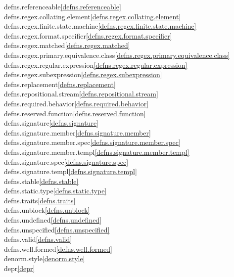 \begin{multicols}{2}
defns.referenceable\quad\ref{defns.referenceable}\\
defns.regex.collating.element\quad\ref{defns.regex.collating.element}\\
defns.regex.finite.state.machine\quad\ref{defns.regex.finite.state.machine}\\
defns.regex.format.specifier\quad\ref{defns.regex.format.specifier}\\
defns.regex.matched\quad\ref{defns.regex.matched}\\
defns.regex.primary.equivalence.class\quad\ref{defns.regex.primary.equivalence.class}\\
defns.regex.regular.expression\quad\ref{defns.regex.regular.expression}\\
defns.regex.subexpression\quad\ref{defns.regex.subexpression}\\
defns.replacement\quad\ref{defns.replacement}\\
defns.repositional.stream\quad\ref{defns.repositional.stream}\\
defns.required.behavior\quad\ref{defns.required.behavior}\\
defns.reserved.function\quad\ref{defns.reserved.function}\\
defns.signature\quad\ref{defns.signature}\\
defns.signature.member\quad\ref{defns.signature.member}\\
defns.signature.member.spec\quad\ref{defns.signature.member.spec}\\
defns.signature.member.templ\quad\ref{defns.signature.member.templ}\\
defns.signature.spec\quad\ref{defns.signature.spec}\\
defns.signature.templ\quad\ref{defns.signature.templ}\\
defns.stable\quad\ref{defns.stable}\\
defns.static.type\quad\ref{defns.static.type}\\
defns.traits\quad\ref{defns.traits}\\
defns.unblock\quad\ref{defns.unblock}\\
defns.undefined\quad\ref{defns.undefined}\\
defns.unspecified\quad\ref{defns.unspecified}\\
defns.valid\quad\ref{defns.valid}\\
defns.well.formed\quad\ref{defns.well.formed}\\
denorm.style\quad\ref{denorm.style}\\
depr\quad\ref{depr}\\

\end{multicols}
